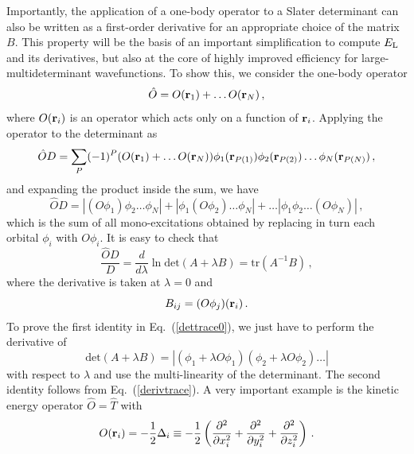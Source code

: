 \documentclass[aip,jcp,reprint,floatfix,onecolumn]{revtex4-1}
\def\det{\text{det}}
\def\tr{\text{tr}}
\def\A{A}
\def\wdet{D}
\begin{document}
Importantly, the application of a one-body operator to a Slater determinant
can also be written as a first-order derivative for an appropriate choice of
the matrix $B$.
This property will be the basis of an important simplification  to compute  $E_{\rm L}$ and its derivatives, but also at the core of highly improved efficiency for large-multideterminant wavefunctions.
To show this, we consider the one-body operator
\begin{equation}
\hat{O} = O({\bf r}_1) + \dots O({\bf r}_N)\,,
\end{equation}
where $O({\bf r}_i)$ is an operator which acts only on a function of ${\bf r}_i$.
Applying the operator to the determinant as
\begin{equation}
\hat{O} \wdet =  \sum_P  (-1)^P  (O({\bf r}_1) + \dots O({\bf r}_N))
\phi_{1}({\bf r}_{P(1)})  \phi_{2}({\bf r}_{P(2)}) \dots \phi_N ({\bf r}_{P(N)})  \,,
\end{equation}
and expanding the product inside the sum, we have
\begin{equation}
\hat{O} \wdet = |(O \phi_1)  \phi_2 \dots \phi_N| + |\phi_1  (O\phi_2) \dots \phi_N| + \dots   |\phi_1  \phi_2 \dots (O \phi_N) |\,,
\label{omono}
\end{equation}
which is the sum of all mono-excitations obtained by replacing in turn each orbital $\phi_i$ with $O \phi_i$.
It is easy to check that
\begin{equation}
\frac{\hat{O}\wdet}{\wdet} = \frac{d}{d\lambda} \ln  \det (\A + \lambda B) =  \tr (\A^{-1}  B) \,,
\label{dettrace0}
\end{equation}
where the derivative is taken at $\lambda=0$ and
\begin{equation}
B_{ij} = (O\phi_j)({\bf r}_i) \,.
\end{equation}
To prove the first identity in  Eq.~(\ref{dettrace0}), we just have to perform the derivative of
\begin{equation}
\det(A+\lambda B) = |(\phi_1 + \lambda O \phi_1) (\phi_2 + \lambda O \phi_2) \dots |
\end{equation}
with respect to $\lambda$ and use the multi-linearity of the determinant. The second identity follows from Eq.~(\ref{derivtrace}).
A very important example is the kinetic energy operator $\hat{O}=\hat{T}$ with
\begin{equation}
O({\bf r}_i)  = -\frac{1}{2}\Delta_i   \equiv -\frac{1}{2} \left(\frac{\partial^2}{\partial x_i^2}+
\frac{\partial^2}{\partial y_i^2} + \frac{\partial^2}{\partial z_i^2}\right) \,.
\end{equation}
\end{document}
